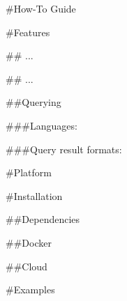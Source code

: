 

#How-To Guide





#Features

## ...


## ...


##Querying



###Languages:
    
    
###Query result formats:
    
    


#Platform

#Installation

##Dependencies

##Docker

##Cloud

#Examples


